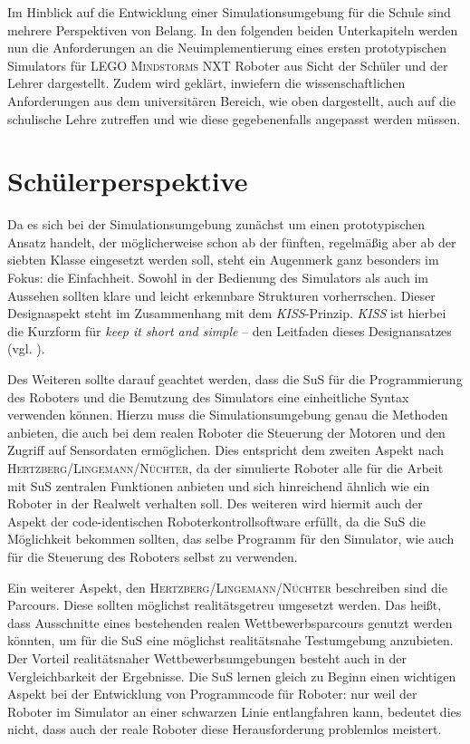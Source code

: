 \documentclass[paper=a4, DIV=calc, BCOR=12mm, twoside=on, onecolumn=on, open = right, titlepage =on, parskip =half-, headsepline = on, footsepline = off, chapterprefix = off, appendixprefix = on, fontsize = 12pt, numbers = noenddot, abstract = on]{scrbook}
\begin{document}
Im Hinblick auf die Entwicklung einer Simulationsumgebung für die Schule sind mehrere Perspektiven von Belang. 
In den folgenden beiden Unterkapiteln werden nun die Anforderungen an die Neuimplementierung eines ersten prototypischen Simulators für \textsc{LEGO Mindstorms} NXT Roboter aus Sicht der Schüler und der Lehrer dargestellt. Zudem wird geklärt, inwiefern die wissenschaftlichen Anforderungen aus dem universitären Bereich, wie oben dargestellt, auch auf die schulische Lehre zutreffen und wie diese gegebenenfalls angepasst werden müssen.
\vspace*{-1ex}
\par \singlespacing
\section{Schülerperspektive}
\label{sec:schüler}
\onehalfspacing

Da es sich bei der Simulationsumgebung zunächst um einen prototypischen Ansatz handelt, der möglicherweise schon ab der fünften, regelmäßig aber ab der siebten Klasse eingesetzt werden soll, steht ein Augenmerk ganz besonders im Fokus: die Einfachheit. Sowohl in der Bedienung des Simulators als auch im Aussehen sollten klare und leicht erkennbare Strukturen vorherrschen. Dieser Designaspekt steht im Zusammenhang mit dem \emph{KISS}-Prinzip. \emph{KISS} ist hierbei die Kurzform für \emph{keep it short and simple} -- den Leitfaden dieses Designansatzes (vgl. \cite[S. 144f.]{moser:12}).

Des Weiteren sollte darauf geachtet werden, dass die SuS für die Programmierung des Roboters und die Benutzung des Simulators eine einheitliche Syntax verwenden können. Hierzu muss die Simulationsumgebung genau die Methoden anbieten, die auch bei dem realen Roboter die Steuerung der Motoren und den Zugriff auf Sensordaten ermöglichen. Dies entspricht dem zweiten Aspekt nach \textsc{Hertz\-berg\-/\-Lin\-ge\-mann\-/Nüch\-ter}, da der simulierte Roboter alle für die Arbeit mit SuS zentralen Funktionen anbieten und sich hinreichend ähnlich wie ein Roboter in der Realwelt verhalten soll. Des weiteren wird hiermit auch der Aspekt der code-identischen Roboterkontrollsoftware erfüllt, da die SuS die Möglichkeit bekommen sollten, das selbe Programm für den Simulator, wie auch für die Steuerung des Roboters selbst zu verwenden.

Ein weiterer Aspekt, den \textsc{Hertz\-berg\-/\-Lin\-ge\-mann\-/Nüch\-ter} beschreiben sind die Parcours. Diese sollten möglichst realitätsgetreu umgesetzt werden. Das heißt, dass Ausschnitte eines bestehenden realen Wettbewerbsparcours genutzt werden könnten, um für die SuS eine möglichst realitätsnahe Testumgebung anzubieten. Der Vorteil realitätsnaher Wettbewerbsumgebungen besteht auch in der Vergleichbarkeit der Ergebnisse. Die SuS lernen gleich zu Beginn einen wichtigen Aspekt bei der Entwicklung von Programmcode für Roboter: nur weil der Roboter im Simulator an einer schwarzen Linie entlangfahren kann, bedeutet dies nicht, dass auch der reale Roboter diese Herausforderung problemlos meistert.
\end{document}
